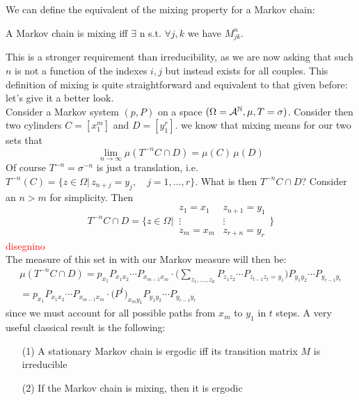 We can define the equivalent of the mixing property for a Markov chain:
\begin{definition}
    A Markov chain is mixing iff $\exists$ n s.t. $\forall j,k$ we have $M_{jk}^n$.
\end{definition}
This is a stronger requirement than irreducibility, as we are now asking that such $n$ is not a function of the indexes $i,j$ but instead exists for all couples. This definition of mixing is quite straightforward and equivalent to that given before: let's give it a better look. 
\\Consider a Markov system $(p, P)$ on a space $(\Omega=\mathcal{A}^{\mathbb{N}}, \mu, T = \sigma)$. Consider then two cylinders $C= [x_1^m]$ and $D= [y_1^r]$. we know that mixing means for our two sets that 
\begin{equation*}
    \lim_{n \rightarrow \infty} \mu (T^{-n}C \cap D) = \mu(C) \, \mu(D)
\end{equation*}
Of course $T^{-n} = \sigma^{-n}$ is just a translation, i.e. $T^{-n}(C) = \big\{ z \in \Omega | \, z_{n+j} = y_j, \quad j=1, \dots, r \big\}$. What is then $T^{-n}C \cap D$? Consider an $n > m$ for simplicity. Then
\begin{equation*}
    T^{-n}C \cap D = \bigg\{ z \in \Omega \bigg| \, 
    \begin{matrix}
        z_1 = x_1 & z_{n+1} = y_1 \\
        \vdots & \vdots\\
        z_m=x_m  & z_{r+n} = y_r
    \end{matrix}
    \bigg\}
\end{equation*}
\textcolor{red}{disegnino}\\
The measure of this set in with our Markov measure will then be:
\begin{align}
    \mu(T^{-n}C \cap D) = p_{x_1} P_{x_1 x_2} \cdots P_{x_{m-1} x_m} \cdot \bigg( \sum_{z_1, \dots, z_k} P_{z_1 z_2} \cdots P_{z_{t-1} z_t = y_1} \bigg) P_{y_1 y_2} \cdots P_{y_{r-1} y_r} \nonumber \\
    =  p_{x_1} P_{x_1 x_2} \cdots P_{x_{m-1} x_m} \cdot \big( P^t\big)_{x_m y_1} P_{y_1 y_2} \cdots P_{y_{r-1} y_r}
\end{align}
since we must account for all possible paths from $x_m$ to $y_1$ in $t$ steps. 
A very useful classical result is the following:
\begin{theorem}
\hfill
    \begin{itemize}
        \item[(1)] A stationary Markov chain is ergodic iff its transition matrix $M$ is irreducible
        \item[(2)] If the Markov chain is mixing, then it is ergodic
    \end{itemize}
\end{theorem}
